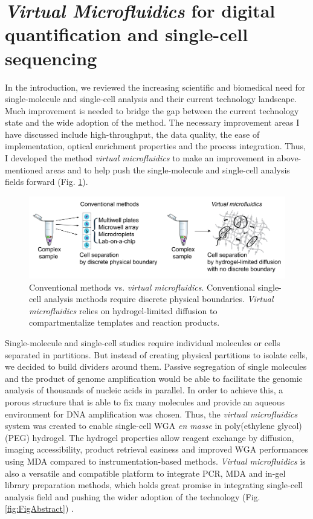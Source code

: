 \section{\textbf{\textit{Virtual Microfluidics}} for
digital quantification and single-cell sequencing}
In the introduction, we reviewed the increasing scientific and biomedical need for single-molecule and single-cell analysis and their current technology landscape. Much improvement is needed to bridge the gap between the current technology state and the wide adoption of the method. The necessary improvement areas I have discussed include high-throughput, the data quality, the ease of implementation, optical enrichment properties and the process integration. Thus, I developed the method \textit{virtual microfluidics} to make an improvement in above-mentioned areas and to help push the single-molecule and single-cell analysis fields forward (Fig. \ref{fig:VM1}). 

\begin{figure}[ht!]
\centering
\includegraphics[keepaspectratio,width=1\textwidth]{./figures/Thesis-20.png}
\caption[Conventional methods vs. \textit{virtual microfluidics}]{Conventional methods vs. \textit{virtual microfluidics}. Conventional single-cell analysis methods
require discrete physical boundaries. \textit{Virtual microfluidics} relies on hydrogel-limited diffusion to compartmentalize templates and reaction products.}
\label{fig:VM1}
\end{figure}

Single-molecule and single-cell studies require individual molecules or cells separated in partitions. But instead of creating physical partitions to isolate cells, we decided to build  dividers around them. Passive segregation of single molecules and the product of genome amplification would be able to facilitate the genomic analysis of thousands of nucleic acids in parallel. In order to achieve this, a porous structure that is able to fix many molecules and provide an aqueous environment for DNA amplification was chosen. Thus, the \textit{virtual microfluidics} system was created to enable single-cell WGA \textit{en masse} in poly(ethylene glycol) (PEG) hydrogel. The hydrogel properties allow reagent exchange by diffusion, imaging accessibility, product retrieval easiness and improved WGA performances using MDA compared to instrumentation-based methods. \textit{Virtual microfluidics} is also a versatile and compatible platform to integrate PCR, MDA and in-gel library preparation methods, which holds great promise in integrating single-cell analysis field and pushing the wider adoption of the technology (Fig. \ref{fig:FigAbstract}) . 

